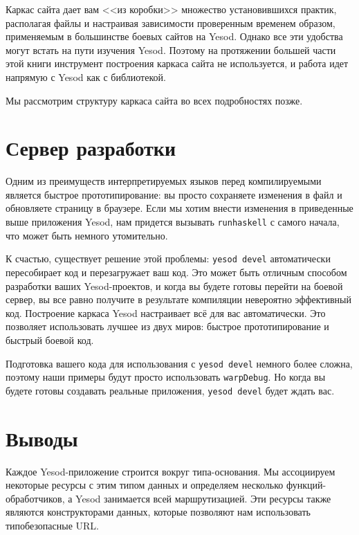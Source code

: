 Каркас сайта дает вам <<из коробки>> множество установившихся практик, располагая файлы и
настраивая зависимости проверенным временем образом, применяемым в большинстве боевых
сайтов на Yesod. Однако все эти удобства могут встать на пути изучения Yesod. Поэтому на
протяжении большей части этой книги инструмент построения каркаса сайта не используется, и
работа идет напрямую с Yesod как с библиотекой.

Мы рассмотрим структуру каркаса сайта во всех подробностях позже.

\section{Сервер разработки}

Одним из преимуществ интерпретируемых языков перед компилируемыми является быстрое
прототипирование: вы просто сохраняете изменения в файл и обновляете страницу в
браузере. Если мы хотим внести изменения в приведенные выше приложения Yesod, нам придется
вызывать \lstinline!runhaskell! с самого начала, что может быть немного утомительно.

К счастью, существует решение этой проблемы: \lstinline'yesod devel' автоматически
пересобирает код и перезагружает ваш код. Это может быть отличным способом разработки
ваших Yesod-проектов, и когда вы будете готовы перейти на боевой сервер, вы все равно
получите в результате компиляции невероятно эффективный код. Построение каркаса Yesod
настраивает всё для вас автоматически. Это позволяет использовать лучшее из двух миров:
быстрое прототипирование и быстрый боевой код.

Подготовка вашего кода для использования с \lstinline!yesod devel! немного более сложна,
поэтому наши примеры будут просто использовать \lstinline!warpDebug!. Но когда вы будете
готовы создавать реальные приложения, \lstinline'yesod devel' будет ждать вас.

\section{Выводы}

Каждое Yesod-приложение строится вокруг типа-основания.  Мы ассоциируем некоторые ресурсы
с этим типом данных и определяем несколько функций-обработчиков, а Yesod занимается всей
маршрутизацией. Эти ресурсы также являются конструкторами данных, которые позволяют нам
использовать типобезопасные URL.

